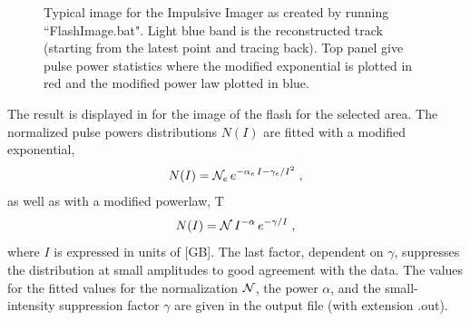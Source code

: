 {\begin{figure}[th]
	\caption{Typical image for the Impulsive Imager as created by running ``FlashImage.bat". Light blue band is the reconstructed track (starting from the latest point and tracing back). Top panel give pulse power statistics where the modified exponential is plotted in red and the modified power law plotted in blue.}	 
\end{figure}

The result is displayed in  for the image of the flash for the selected area. The normalized pulse powers distributions $N(I)$ are fitted with a modified exponential,
\begin{equation}
N(I)= {\cal N}_e \,e^{-\alpha_e\,I-\gamma_e/I^2}\;, \eqlab{PowLaw}
\end{equation}
as well as with a modified powerlaw,
T\begin{equation}
N(I)= {\cal N} \,I^{-\alpha}  \,e^{-\gamma/I}\;, \eqlab{PowLaw}
\end{equation}
where $I$ is expressed in units of [GB]. The last factor, dependent on $\gamma$, suppresses the distribution at small amplitudes to good agreement with the data. The values for the fitted values for the normalization ${\cal N}$, the power $\alpha$, and the small-intensity suppression factor $\gamma$ are given in the output file (with extension .out).

}

